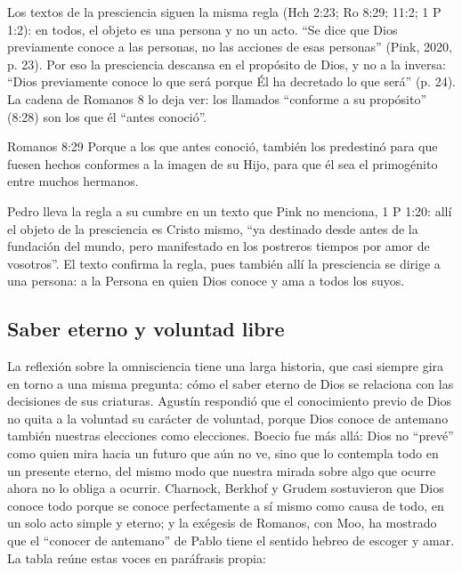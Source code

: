 Los textos de la presciencia siguen la misma regla (Hch 2:23; Ro 8:29; 11:2; 1 P 1:2): en todos, el objeto es una persona y no un acto. ``Se dice que Dios previamente conoce a las personas, no las acciones de esas personas'' (Pink, 2020, p. 23). Por eso la presciencia descansa en el propósito de Dios, y no a la inversa: ``Dios previamente conoce lo que será porque Él ha decretado lo que será'' (p. 24). La cadena de Romanos 8 lo deja ver: los llamados ``conforme a su propósito'' (8:28) son los que él ``antes conoció''.

\begin{verso}{Romanos 8:29}
Porque a los que antes conoció, también los predestinó para que fuesen hechos conformes a la imagen de su Hijo, para que él sea el primogénito entre muchos hermanos.
\end{verso}

Pedro lleva la regla a su cumbre en un texto que Pink no menciona, 1 P 1:20: allí el objeto de la presciencia es Cristo mismo, ``ya destinado desde antes de la fundación del mundo, pero manifestado en los postreros tiempos por amor de vosotros''. El texto confirma la regla, pues también allí la presciencia se dirige a una persona: a la Persona en quien Dios conoce y ama a todos los suyos.

\subsection{Saber eterno y voluntad libre}
La reflexión sobre la omnisciencia tiene una larga historia, que casi siempre gira en torno a una misma pregunta: cómo el saber eterno de Dios se relaciona con las decisiones de sus criaturas. Agustín respondió que el conocimiento previo de Dios no quita a la voluntad su carácter de voluntad, porque Dios conoce de antemano también nuestras elecciones como elecciones. Boecio fue más allá: Dios no ``prevé'' como quien mira hacia un futuro que aún no ve, sino que lo contempla todo en un presente eterno, del mismo modo que nuestra mirada sobre algo que ocurre ahora no lo obliga a ocurrir. Charnock, Berkhof y Grudem sostuvieron que Dios conoce todo porque se conoce perfectamente a sí mismo como causa de todo, en un solo acto simple y eterno; y la exégesis de Romanos, con Moo, ha mostrado que el ``conocer de antemano'' de Pablo tiene el sentido hebreo de escoger y amar. La tabla reúne estas voces en paráfrasis propia:

